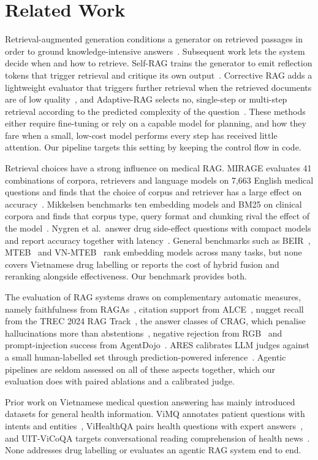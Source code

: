 \section{Related Work}\label{sec:related}

Retrieval-augmented generation conditions a generator on retrieved passages in order to ground knowledge-intensive answers~\cite{lewis2020rag}. Subsequent work lets the system decide when and how to retrieve. Self-RAG trains the generator to emit reflection tokens that trigger retrieval and critique its own output~\cite{asai2024selfrag}. Corrective RAG adds a lightweight evaluator that triggers further retrieval when the retrieved documents are of low quality~\cite{yan2024crag}, and Adaptive-RAG selects no, single-step or multi-step retrieval according to the predicted complexity of the question~\cite{jeong2024adaptiverag}. These methods either require fine-tuning or rely on a capable model for planning, and how they fare when a small, low-cost model performs every step has received little attention. Our pipeline targets this setting by keeping the control flow in code.

Retrieval choices have a strong influence on medical RAG. MIRAGE evaluates 41 combinations of corpora, retrievers and language models on 7{,}663 English medical questions and finds that the choice of corpus and retriever has a large effect on accuracy~\cite{xiong2024medrag}. Mikkelsen benchmarks ten embedding models and BM25 on clinical corpora and finds that corpus type, query format and chunking rival the effect of the model~\cite{mikkelsen2026clinical}. Nygren et al.\ answer drug side-effect questions with compact models and report accuracy together with latency~\cite{nygren2026drug}. General benchmarks such as BEIR~\cite{thakur2021beir}, MTEB~\cite{muennighoff2023mteb} and VN-MTEB~\cite{pham2025vnmteb} rank embedding models across many tasks, but none covers Vietnamese drug labelling or reports the cost of hybrid fusion and reranking alongside effectiveness. Our benchmark provides both.

The evaluation of RAG systems draws on complementary automatic measures, namely faithfulness from RAGAs~\cite{es2024ragas}, citation support from ALCE~\cite{gao2023alce}, nugget recall from the TREC 2024 RAG Track~\cite{pradeep2024nuggets}, the answer classes of CRAG, which penalise hallucinations more than abstentions~\cite{yang2024cragbench}, negative rejection from RGB~\cite{chen2024rgb} and prompt-injection success from AgentDojo~\cite{debenedetti2024agentdojo}. ARES calibrates LLM judges against a small human-labelled set through prediction-powered inference~\cite{saadfalcon2024ares,angelopoulos2023ppi}. Agentic pipelines are seldom assessed on all of these aspects together, which our evaluation does with paired ablations and a calibrated judge.

Prior work on Vietnamese medical question answering has mainly introduced datasets for general health information. ViMQ annotates patient questions with intents and entities~\cite{huy2021vimq}, ViHealthQA pairs health questions with expert answers~\cite{nguyen2022spbertqa}, and UIT-ViCoQA targets conversational reading comprehension of health news~\cite{luu2021vicoqa}. None addresses drug labelling or evaluates an agentic RAG system end to end.
